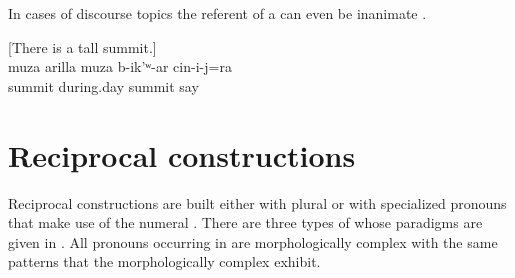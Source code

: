 In cases of discourse topics the referent of a  can even be inanimate .
%
\begin{exe}
	\ex	\label{ex:‎[‎‎There is a tall summit.] It is called the midday summit} ‎[‎‎There is a tall summit.] \\
	\gll	muza	arilla	muza	b-ik'ʷ-ar	cin-i-j=ra\\
		summit	during.day	summit	say	\\
	\glt	{}
\end{exe}



\section{Reciprocal constructions}
\label{sec:Reciprocal constructionss}

Reciprocal constructions are built either with plural   or with specialized pronouns that make use of the numeral  . There are three types of  whose paradigms are given in . All pronouns occurring in  are morphologically complex with the same patterns that the morphologically complex  exhibit.

